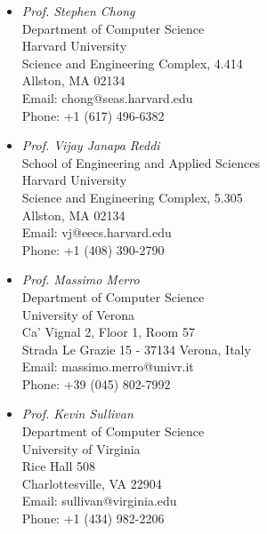\documentclass[11pt]{article}
\begin{document}
\begin{minipage}{0.45\textwidth}
\begin{itemize}
  \item \emph{Prof. Stephen Chong} \\
Department of Computer Science \\
Harvard University \\
Science and Engineering Complex, 4.414 \\
Allston, MA 02134 \\
Email: chong@seas.harvard.edu \\
Phone: +1 (617) 496-6382 \\

\item \emph{Prof. Vijay Janapa Reddi} \\
School of Engineering and Applied Sciences \\
Harvard University \\
Science and Engineering Complex, 5.305 \\
Allston, MA 02134 \\
Email: vj@eecs.harvard.edu \\
Phone: +1 (408) 390-2790 \\
\end{itemize}
\end{minipage}%
\hfill
\begin{minipage}{0.45\textwidth}
\begin{itemize}
  \item \emph{Prof. Massimo Merro} \\
Department of Computer Science \\
University of Verona \\
Ca' Vignal 2,  Floor 1,  Room 57 \\
Strada Le Grazie 15 - 37134 Verona, Italy \\
Email: massimo.merro@univr.it \\
Phone: +39  (045) 802-7992 \\

    
\item \emph{Prof. Kevin Sullivan} \\
Department of Computer Science \\
University of Virginia \\
Rice Hall 508 \\
Charlottesville, VA 22904 \\
Email: sullivan@virginia.edu \\
Phone: +1  (434) 982-2206 \\
\end{itemize}
\end{minipage}%
\end{document}
